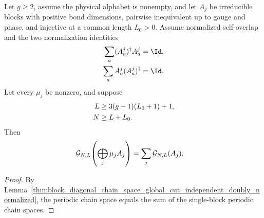 \begin{lemma}
    \label{thm:block_diagonal_chain_space_global_cut_doubly_normalized}
    \leanok
    Let $g\ge2$, assume the physical alphabet is nonempty, and let $A_j$
    be irreducible blocks with positive bond dimensions, pairwise inequivalent
    up to gauge and phase, and injective at a common length $L_0>0$. Assume
    normalized self-overlap and the two normalization identities
    \begin{align}
        \sum_a(A^j_a)^\dagger A^j_a & =\Id,
        \notag                              \\
        \sum_aA^j_a(A^j_a)^\dagger  & =\Id.
        \notag
    \end{align}
    Let every $\mu_j$ be nonzero, and suppose
    \begin{align}
        L & \ge3(g-1)(L_0+1)+1,
        \notag                  \\
        N & \ge L+L_0.
        \notag
    \end{align}
    Then
    \begin{align}
        \mathcal G_{N,L}\!\left(\bigoplus_j\mu_jA_j\right)
         & =
        \sum_j\mathcal G_{N,L}(A_j).
        \notag
    \end{align}
\end{lemma}

\begin{proof}\leanok
    By
    Lemma~\ref{thm:block_diagonal_chain_space_global_cut_independent_doubly_normalized},
    the periodic chain space equals the sum of the single-block periodic chain
    spaces.
\end{proof}


